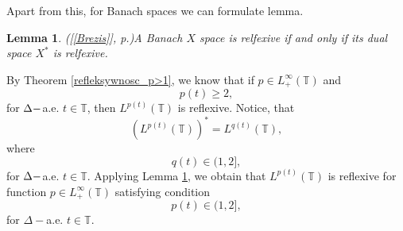 \documentclass[12pt,a4paper,oneside,titlepage]{article}
\newtheorem{Lemat}{Lemma}
\begin{document}
Apart from this, for Banach spaces we can formulate lemma.
\begin{Lemat}
\label{reflexive_dual}
([\ref{Brezis}], p.)A Banach $X$ space is relfexive if and only if its dual space $X^{*}$ is relfexive.
\end{Lemat}
\indent
By Theorem \ref{refleksywnosc_p>1}, we know that if $p \in L^{\infty}_{+}(\mathbb{T})$ and
\begin{equation}
\nonumber
p(t) \geq 2,
\end{equation}
for $\Delta \-- $a.e. $t \in \mathbb{T}$, then $L^{p(t)}(\mathbb{T})$ is reflexive. Notice, that
\begin{equation}
(L^{p(t)}(\mathbb{T}))^{*}= L^{q(t)}(\mathbb{T}),
\end{equation}
where
\begin{equation}
\nonumber
q(t) \in (1,2],
\end{equation}
for $\Delta \-- $a.e. $t \in \mathbb{T}$. Applying Lemma \ref{reflexive_dual},
we obtain that $L^{p(t)}(\mathbb{T})$ is reflexive for function $p \in L^{\infty}_{+}(\mathbb{T})$ satisfying condition
\begin{equation}
\nonumber
p(t) \in (1,2],
\end{equation}
for $\Delta-$a.e. $t \in \mathbb{T}$.
\end{document}
